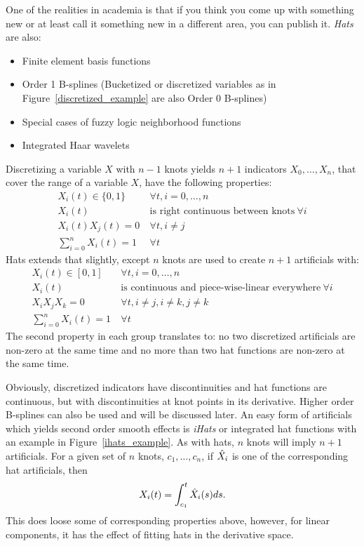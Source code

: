 \documentclass[10pt]{article}
\begin{document}
One of the realities in academia is that if you think you come up with something new or at least call it something new
in a different area, you can publish it.  {\em Hats} are also:
\begin{itemize}
    \item Finite element basis functions
    \item Order 1 B-splines (Bucketized or discretized variables as in Figure~\ref{discretized_example} are also Order 0 B-splines)
    \item Special cases of fuzzy logic neighborhood functions
    \item Integrated Haar wavelets
\end{itemize}
Discretizing a variable $X$ with $n-1$ knots yields $n+1$
indicators $X_0, \ldots, X_n$, that cover the range of a variable $X$, have the following properties:
\begin{align*}
    X_i(t) \in \{0, 1\} & \ \forall t, i=0,\ldots,n \\
    X_i(t) & \ \text{is right continuous between knots}~\forall i \\
    X_i(t)X_j(t)  = 0 & \ \forall t, i\ne j \\
    \sum_{i=0}^n X_i(t)  = 1 & \ \forall t 
\end{align*}
Hats extends that slightly, except $n$ knots are used to create $n+1$ artificials with:
\begin{align*}
    X_i(t) \in [0, 1] & \  \forall t, i=0,\ldots,n \\
    X_i(t) & \ \text{is continuous and piece-wise-linear everywhere}~\forall i \\
    X_iX_jX_k  = 0 & \ \forall t, i\ne j, i\ne k, j\ne k \\
    \sum_{i=0}^n X_i(t)  = 1  & \ \forall t
\end{align*}
The second property in each group translates to: no two discretized artificials are non-zero at the same time and no more than two 
hat functions are non-zero at the same time.

Obviously, discretized indicators have discontinuities and hat functions are continuous, but with discontinuities at knot points
in its derivative.  Higher order B-splines can also be used and will be discussed later.  An easy form of artificials
which yields second order smooth effects is {\em iHats} or integrated hat functions with an example in Figure~\ref{ihats_example}.
As with hats, $n$ knots will imply $n+1$ artificials.  For a given set of $n$ knots, $c_1, \ldots, c_n$, if $\Hat{X}_i$ is one of 
the corresponding hat artificials, then
$$X_i(t) =\int_{c_1}^t\Hat{X}_i(s)ds.$$
This does loose some of corresponding properties above, however, for linear components, it has the 
effect of fitting hats in the derivative space.
\end{document}
